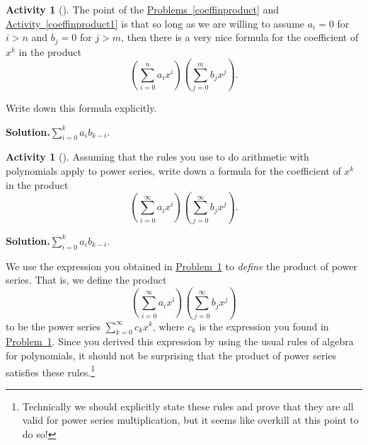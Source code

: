 \documentclass[10pt,]{book}
\theoremstyle{plain}
\theoremstyle{definition}
\newtheorem{activity}[project]{Activity}
\numberwithin{equation}{chapter}
\begin{document}
\begin{activity}[]\label{activity-177}
The point of the \hyperref[coeffinproduct]{Problems~\ref{coeffinproduct}} and \hyperref[coeffinproduct1]{Activity~\ref{coeffinproduct1}} is that so long as we are willing to assume \(a_i=0\) for \(i>n\) and \(b_j =0\) for \(j>m\), then there is a very nice formula for the coefficient of \(x^k\) in the product%
\begin{equation*}
\left(\sum_{i=0}^n a_ix^i\right)\left(\sum_{j=0}^m b_jx^j\right).
\end{equation*}
%
\par
Write down this formula explicitly.%
\par\medskip\noindent%
\textbf{Solution.}\quad \(\sum_{i=0}^k a_ib_{k-i}\).%
\end{activity}
\begin{activity}[]\label{coeffinpowerseries}
Assuming that the rules you use to do arithmetic with polynomials apply to power series, write down a formula for the coefficient of \(x^k\) in the product%
\begin{equation*}
\left(\sum_{i=0}^\infty a_ix^i\right)\left(\sum_{j=0}^\infty
b_jx^j\right).
\end{equation*}
%
\par\medskip\noindent%
\textbf{Solution.}\quad \(\sum_{i=0}^k a_ib_{k-i}\).%
\end{activity}
We use the expression you obtained in \hyperref[coeffinpowerseries]{Problem~\ref{coeffinpowerseries}} to \emph{define} the product of power series. That is, we define the product%
\begin{equation*}
\left(\sum_{i=0}^\infty a_ix^i\right)\left(\sum_{j=0}^\infty
b_jx^j\right)
\end{equation*}
to be the power series \(\sum_{k=0}^\infty c_k x^k\), where \(c_k\) is the expression you found in \hyperref[coeffinpowerseries]{Problem~\ref{coeffinpowerseries}}. Since you derived this expression by using the usual rules of algebra for polynomials, it should not be surprising that the product of power series satisfies these rules.\footnote{Technically we should explicitly state these rules and prove that they are all valid for power series multiplication, but it seems like overkill at this point to do so!\label{fn-11}}%
\typeout{************************************************}
\typeout{************************************************}
\end{document}
